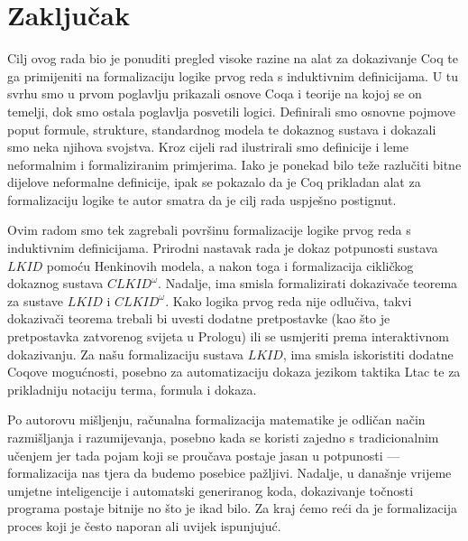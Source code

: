 \chapter{Zaključak}\label{cha:zakljucak}
Cilj ovog rada bio je ponuditi pregled visoke razine na alat za dokazivanje Coq te
ga primijeniti na formalizaciju logike prvog reda s induktivnim definicijama.
U tu svrhu smo u prvom poglavlju prikazali osnove Coqa i teorije na kojoj se on temelji,
dok smo ostala poglavlja posvetili logici.
Definirali smo osnovne pojmove poput formule, strukture, standardnog modela te dokaznog sustava
i dokazali smo neka njihova svojstva.
Kroz cijeli rad ilustrirali smo definicije i leme neformalnim i formaliziranim primjerima.
Iako je ponekad bilo teže razlučiti bitne dijelove neformalne definicije,
ipak se pokazalo da je Coq prikladan alat za formalizaciju logike te autor smatra
da je cilj rada uspješno postignut.

Ovim radom smo tek zagrebali površinu formalizacije logike prvog reda s induktivnim definicijama.
Prirodni nastavak rada je dokaz potpunosti sustava \(\mathit{LKID}\) pomoću Henkinovih modela,
a nakon toga i formalizacija cikličkog dokaznog sustava \(\mathit{CLKID}^{\omega}\)\!.
Nadalje, ima smisla formalizirati dokazivače teorema za sustave \(\mathit{LKID}\)
i \(\mathit{CLKID}^{\omega}\)\!. Kako logika prvog reda nije odlučiva, takvi dokazivači teorema
trebali bi uvesti dodatne pretpostavke (kao što je pretpostavka zatvorenog svijeta u Prologu)
ili se usmjeriti prema interaktivnom dokazivanju.
Za našu formalizaciju sustava \(\mathit{LKID}\),
ima smisla iskoristiti dodatne Coqove mogućnosti,
posebno za automatizaciju dokaza jezikom taktika Ltac
te za prikladniju notaciju terma, formula i dokaza.

Po autorovu mišljenju, računalna formalizacija matematike je odličan način razmišljanja i razumijevanja,
posebno kada se koristi zajedno s tradicionalnim učenjem jer tada 
 pojam koji se proučava postaje jasan u potpunosti --- formalizacija nas tjera da budemo
posebice pažljivi. Nadalje, u današnje vrijeme umjetne inteligencije i automatski
generiranog koda, dokazivanje točnosti programa postaje bitnije no što je ikad bilo.
Za kraj ćemo reći da je formalizacija proces koji je često naporan ali uvijek ispunjujuć.

